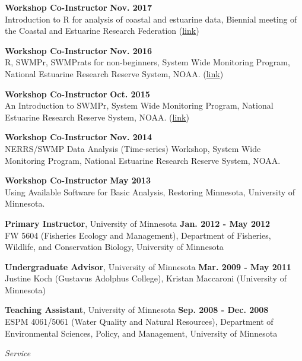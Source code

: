 \documentclass[letterpaper,12pt]{article}
\newcommand{\sectitle}[1]{\vspace{\baselineskip} \centerline{\large{\textit{#1}}}}
\begin{document}
{\bf Workshop Co-Instructor} \hfill {\bf Nov. 2017}\\
Introduction to R for analysis of coastal and estuarine data, Biennial meeting of the Coastal and Estuarine Research Federation ({\footnotesize\href{https://usepa.github.io/cerf_r/}{link}})

{\bf Workshop Co-Instructor} \hfill {\bf Nov. 2016}\\
R, SWMPr, SWMPrats for non-beginners, System Wide Monitoring Program, National Estuarine Research Reserve System, NOAA. ({\footnotesize\href{http://swmprats.net/2016-workshop}{link}})

{\bf Workshop Co-Instructor} \hfill {\bf Oct. 2015}\\
An Introduction to SWMPr, System Wide Monitoring Program, National Estuarine Research Reserve System, NOAA. ({\footnotesize\href{http://swmprats.net/workshop-2015}{link}})

{\bf Workshop Co-Instructor} \hfill {\bf Nov. 2014}\\
NERRS/SWMP Data Analysis (Time-series) Workshop, System Wide Monitoring Program, National Estuarine Research Reserve System, NOAA.

{\bf Workshop Co-Instructor} \hfill {\bf May 2013} \\
Using Available Software for Basic Analysis, Restoring Minnesota, University of Minnesota.

{\bf Primary Instructor}, University of Minnesota \hfill {\bf Jan. 2012 - May 2012} \\
FW 5604 (Fisheries Ecology and Management), Department of Fisheries, Wildlife, and Conservation Biology, University of Minnesota

{\bf Undergraduate Advisor}, University of Minnesota \hfill {\bf Mar. 2009 - May 2011} \\
Justine Koch (Gustavus Adolphus College), Kristan Maccaroni (University of Minnesota)

{\bf Teaching Assistant}, University of Minnesota \hfill {\bf Sep. 2008 - Dec. 2008} \\
ESPM 4061/5061 (Water Quality and Natural Resources), Department of Environmental Sciences, Policy, and Management, University of Minnesota

\sectitle{Service}
\end{document}

